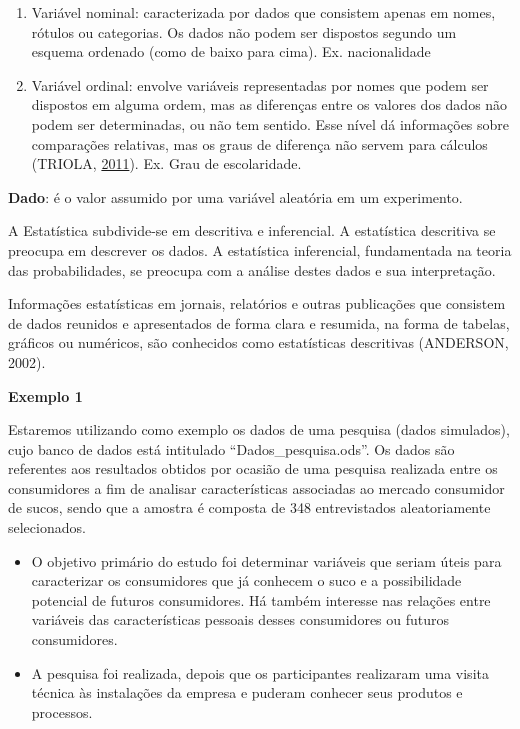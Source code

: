 \documentclass[12pt,brazil,oneside]{book}
\begin{document}
\begin{enumerate}
\def\labelenumi{\alph{enumi})}
\item
  Variável nominal: caracterizada por dados que consistem apenas em
  nomes, rótulos ou categorias. Os dados não podem ser dispostos segundo
  um esquema ordenado (como de baixo para cima). Ex. nacionalidade
\item
  Variável ordinal: envolve variáveis representadas por nomes que podem
  ser dispostos em alguma ordem, mas as diferenças entre os valores dos
  dados não podem ser determinadas, ou não tem sentido. Esse nível dá
  informações sobre comparações relativas, mas os graus de diferença não
  servem para cálculos (TRIOLA,
  \protect\hyperlink{ref-triola1999}{2011}). Ex. Grau de escolaridade.
\end{enumerate}

\textbf{Dado}: é o valor assumido por uma variável aleatória em um
experimento.

A Estatística subdivide-se em descritiva e inferencial. A estatística
descritiva se preocupa em descrever os dados. A estatística inferencial,
fundamentada na teoria das probabilidades, se preocupa com a análise
destes dados e sua interpretação.

Informações estatísticas em jornais, relatórios e outras publicações que
consistem de dados reunidos e apresentados de forma clara e resumida, na
forma de tabelas, gráficos ou numéricos, são conhecidos como
estatísticas descritivas (ANDERSON, 2002).

\textbf{Exemplo 1}

Estaremos utilizando como exemplo os dados de uma pesquisa (dados
simulados), cujo banco de dados está intitulado ``Dados\_pesquisa.ods''.
Os dados são referentes aos resultados obtidos por ocasião de uma
pesquisa realizada entre os consumidores a fim de analisar
características associadas ao mercado consumidor de sucos, sendo que a
amostra é composta de 348 entrevistados aleatoriamente selecionados.

\begin{itemize}
\item
  O objetivo primário do estudo foi determinar variáveis que seriam
  úteis para caracterizar os consumidores que já conhecem o suco e a
  possibilidade potencial de futuros consumidores. Há também interesse
  nas relações entre variáveis das características pessoais desses
  consumidores ou futuros consumidores.
\item
  A pesquisa foi realizada, depois que os participantes realizaram uma
  visita técnica às instalações da empresa e puderam conhecer seus
  produtos e processos.
\end{itemize}
\end{document}
